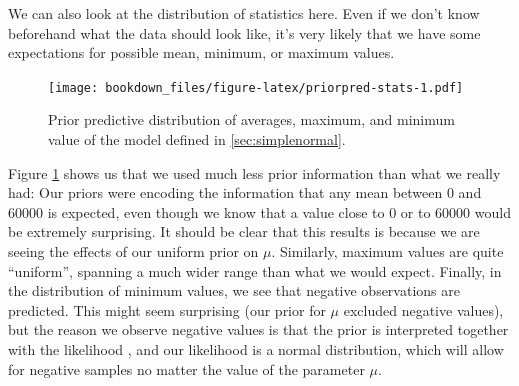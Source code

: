 \documentclass[12pt,]{krantz}
\newenvironment{Shaded}{\begin{snugshade}}{\end{snugshade}}
\newcommand{\CommentTok}[1]{\textcolor[rgb]{0.56,0.35,0.01}{\textit{#1}}}
\newcommand{\DataTypeTok}[1]{\textcolor[rgb]{0.13,0.29,0.53}{#1}}
\newcommand{\DecValTok}[1]{\textcolor[rgb]{0.00,0.00,0.81}{#1}}
\newcommand{\KeywordTok}[1]{\textcolor[rgb]{0.13,0.29,0.53}{\textbf{#1}}}
\newcommand{\NormalTok}[1]{#1}
\newcommand{\OperatorTok}[1]{\textcolor[rgb]{0.81,0.36,0.00}{\textbf{#1}}}
\newcommand{\StringTok}[1]{\textcolor[rgb]{0.31,0.60,0.02}{#1}}
\theoremstyle{definition}
\theoremstyle{definition}
\theoremstyle{definition}
\theoremstyle{remark}
\begin{document}
We can also look at the distribution of statistics here. Even if we don't know beforehand what the data should look like, it's very likely that we have some expectations for possible mean, minimum, or maximum values.



\begin{Shaded}
\end{Shaded}

\begin{figure}
\centering
\texttt{[image: bookdown\_files/figure-latex/priorpred-stats-1.pdf]}
\caption{\label{fig:priorpred-stats}Prior predictive distribution of averages, maximum, and minimum value of the model defined in \ref{sec:simplenormal}.}
\end{figure}

Figure \ref{fig:priorpred-stats} shows us that we used much less prior information than what we really had: Our priors were encoding the information that any mean between 0 and 60000 is expected, even though we know that a value close to 0 or to 60000 would be extremely surprising. It should be clear that this results is because we are seeing the effects of our uniform prior on \(\mu\). Similarly, maximum values are quite ``uniform'', spanning a much wider range than what we would expect. Finally, in the distribution of minimum values, we see that negative observations are predicted. This might seem surprising (our prior for \(\mu\) excluded negative values), but the reason we observe negative values is that the prior is interpreted together with the likelihood \citep{gelmanPriorCanOften2017}, and our likelihood is a normal distribution, which will allow for negative samples no matter the value of the parameter \(\mu\).
\end{document}
